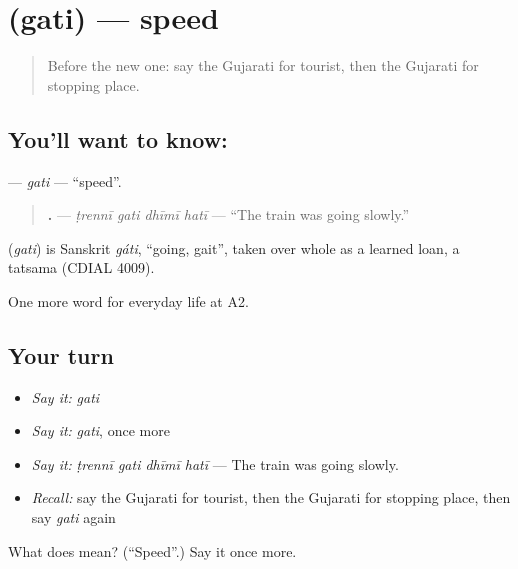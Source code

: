 \section[\texorpdfstring{\gu{ગતિ} (gati)}{ગતિ (gati)}]{ (gati) — speed}

\label{lesson:GU-C206-gati}



\begin{quote}
Before the new one: say the Gujarati for tourist, then the Gujarati for stopping place.
\end{quote}

\subsection*{You'll want to know: }
\textbf{} — \emph{gati} — \textquotedblleft{}speed\textquotedblright{}.

\begin{quote}
\textbf{   .} — \emph{ṭrennī gati dhīmī hatī} — \textquotedblleft{}The train was going slowly.\textquotedblright{}
\end{quote}

\begin{cousinweb}
\textbf{} (\emph{gati}) is Sanskrit \emph{gáti}, \textquotedblleft{}going, gait\textquotedblright{}, taken over whole as a learned loan, a tatsama (CDIAL 4009).
\end{cousinweb}

\begin{grammarlens}[title={What you've built}]
One more word for everyday life at A2.
\end{grammarlens}

\subsection*{Your turn}
\begin{itemize}
\raggedright
  \item \emph{Say it:} \emph{gati}
  \item \emph{Say it:} \emph{gati}, once more
  \item \emph{Say it:} \emph{ṭrennī gati dhīmī hatī} — The train was going slowly.
  \item \emph{Recall:} say the Gujarati for tourist, then the Gujarati for stopping place, then say \emph{gati} again
\end{itemize}

\begin{tcolorbox}[breakable,colback=teal!4,colframe=teal!35!black,title={Before you move on}]
What does  mean? (\textquotedblleft{}Speed\textquotedblright{}.) Say it once more.
\end{tcolorbox}
